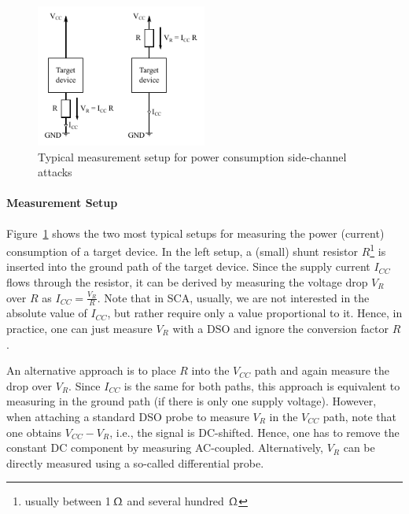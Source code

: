 \begin{figure}[h!tb]
		\center
		\includegraphics[width=0.5\textwidth]{figures/impl_attacks/measurement}	
		\caption{Typical measurement setup for power consumption side-channel attacks}
		\label{fig:impl_attacks:measurement}
\end{figure} 


\paragraph{Measurement Setup}
Figure~\ref{fig:impl_attacks:measurement} shows the two most typical setups for measuring the power (current) consumption of a target device. In the left setup, a (small) shunt resistor $R$\footnote{usually between 1\,$\Upomega$ and several hundred $\Upomega$} is inserted into the ground path of the target device. Since the supply current $I_{CC}$ flows through the resistor, it can be derived by measuring the voltage drop $V_R$ over $R$ as $I_{CC} = \frac{V_R}{R}$. Note that in \ac{SCA}, usually, we are not interested in the absolute value of $I_{CC}$, but rather require only a value proportional to it. Hence, in practice, one can just measure $V_R$ with a \ac{DSO} and ignore the conversion factor $R$. 

An alternative approach is to place $R$ into the $V_{CC}$ path and again measure the drop over $V_R$. Since $I_{CC}$ is the same for both paths, this approach is equivalent to measuring in the ground path (if there is only one supply voltage). However, when attaching a standard \ac{DSO} probe to measure $V_R$ in the $V_{CC}$ path, note that one obtains $V_{CC} - V_R$, i.e., the signal is \acs{DC}-shifted. Hence, one has to remove the constant \acs{DC} component by measuring \acs{AC}-coupled. Alternatively, $V_R$ can be directly measured using a so-called differential probe. 



